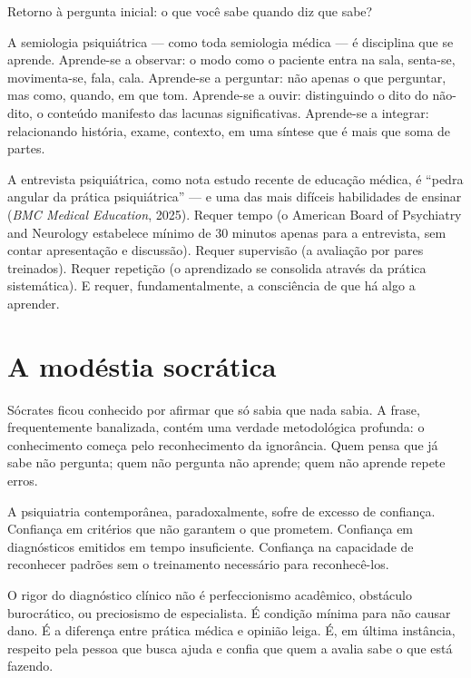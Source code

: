 Retorno à pergunta inicial: o que você sabe quando diz que sabe?

A semiologia psiquiátrica --- como toda semiologia médica --- é disciplina que se aprende. Aprende-se a observar: o modo como o paciente entra na sala, senta-se, movimenta-se, fala, cala. Aprende-se a perguntar: não apenas o que perguntar, mas como, quando, em que tom. Aprende-se a ouvir: distinguindo o dito do não-dito, o conteúdo manifesto das lacunas significativas. Aprende-se a integrar: relacionando história, exame, contexto, em uma síntese que é mais que soma de partes.

A entrevista psiquiátrica, como nota estudo recente de educação médica, é \enquote{pedra angular da prática psiquiátrica} --- e uma das mais difíceis habilidades de ensinar (\textit{BMC Medical Education}, 2025). Requer tempo (o American Board of Psychiatry and Neurology estabelece mínimo de 30 minutos apenas para a entrevista, sem contar apresentação e discussão). Requer supervisão (a avaliação por pares treinados). Requer repetição (o aprendizado se consolida através da prática sistemática). E requer, fundamentalmente, a consciência de que há algo a aprender.

\section{A modéstia socrática}
\label{sec:modestia-socratica}

Sócrates ficou conhecido por afirmar que só sabia que nada sabia. A frase, frequentemente banalizada, contém uma verdade metodológica profunda: o conhecimento começa pelo reconhecimento da ignorância. Quem pensa que já sabe não pergunta; quem não pergunta não aprende; quem não aprende repete erros.

A psiquiatria contemporânea, paradoxalmente, sofre de excesso de confiança. Confiança em critérios que não garantem o que prometem. Confiança em diagnósticos emitidos em tempo insuficiente. Confiança na capacidade de reconhecer padrões sem o treinamento necessário para reconhecê-los.

O rigor do diagnóstico clínico não é perfeccionismo acadêmico, obstáculo burocrático, ou preciosismo de especialista. É condição mínima para não causar dano. É a diferença entre prática médica e opinião leiga. É, em última instância, respeito pela pessoa que busca ajuda e confia que quem a avalia sabe o que está fazendo.

